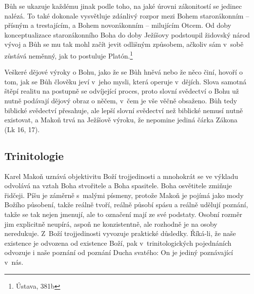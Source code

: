 Bůh se ukazuje každému jinak podle toho, na jaké úrovni zákonitostí se jedinec
nalézá. To také dokonale vysvětluje zdánlivý rozpor mezi Bohem starozákonním --
přísným a trestajícím, a Bohem novozákonním -- milujícím Otcem. Od doby
konceptualizace starozákonního Boha do doby Ježíšovy podstoupil židovský národ
vývoj a Bůh se mu tak mohl začít jevit odlišným způsobem, ačkoliv sám v~sobě
zůstává neměnný, jak to postuluje Platón.\footnote{Ústava, 381b}

Veškeré dějové výroky o Bohu, jako že se Bůh hněvá nebo že něco činí, hovoří o
tom, jak se Bůh člověku jeví v~jeho mysli, která operuje v~dějích. Slova samotná
štěpí realitu na postupně se odvíjející proces, proto slovní svědectví o Bohu už
nutně podávají dějový obraz o něčem, v~čem je vše věčně obsaženo. Bůh tedy
biblické svědectví přesahuje, ale lepší slovní svědectví než biblické nemusí
nutně existovat, a Makoň trvá na Ježíšově výroku, že nepomine jediná čárka
Zákona (Lk 16, 17).

\subsection{Trinitologie}

Karel Makoň uznává objektivitu Boží trojjedinosti a mnohokrát se ve výkladu
odvolává na vztah Boha stvořitele a Boha spasitele. Boha osvětitele zmiňuje
řidčeji. Píšu je záměrně s~malými
písmeny, protože Makoň je pojímá jako mody Božího působení, takže reálně tvoří,
reálně působí spásu a reálně udělují poznání, takže se tak nejen jmenují, ale to označení mají ze své
podstaty. Osobní rozměr jim explicitně neupírá, aspoň ne konzistentně, ale
rozhodně je na osoby neredukuje. Z~Boží trojjedinosti vyvozuje praktické důsledky.
Říká-li, že naše existence je odvozena od existence Boží, pak v~trinitologických
pojednáních odvozuje i naše poznání od poznání Ducha svatého: On je jediný
poznávající v~nás.

